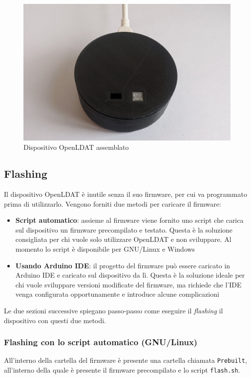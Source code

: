 \begin{figure}[H]
	\centering
	\includegraphics[width=\textwidth]{Dispositivo_files/assembly_15.jpg}
	\caption{Dispositivo OpenLDAT assemblato}
	\label{fig:assembly_15}
\end{figure}

\subsection{Flashing}
Il dispositivo OpenLDAT è inutile senza il suo firmware, per cui va programmato prima di utilizzarlo. Vengono forniti due metodi per caricare il firmware:
\begin{itemize}
	\item \textbf{Script automatico}: assieme al firmware viene fornito uno script che carica sul dispositivo un firmware precompilato e testato. Questa è la soluzione consigliata per chi vuole solo utilizzare OpenLDAT e non sviluppare. Al momento lo script è disponibile per GNU/Linux e Windows
	\item \textbf{Usando Arduino IDE}: il progetto del firmware può essere caricato in Arduino IDE e caricato sul dispositivo da lì. Questa è la soluzione ideale per chi vuole sviluppare versioni modificate del firmware, ma richiede che l'IDE venga configurata opportunamente e introduce alcune complicazioni
\end{itemize}

Le due sezioni successive spiegano passo-passo come eseguire il \textit{flashing} il dispositivo con questi due metodi.

\subsubsection{Flashing con lo script automatico (GNU/Linux)}
All'interno della cartella del firmware è presente una cartella chiamata \texttt{Prebuilt}, all'interno della quale è presente il firmware precompilato e lo script \texttt{flash.sh}.

